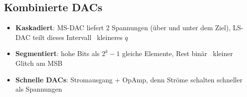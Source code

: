 \vspace{3pt}
\noindent\resizebox{\columnwidth}{!}{}


\subsection{Kombinierte DACs}

\begin{itemize}[nosep,leftmargin=*]
	\item \textbf{Kaskadiert}: MS-DAC liefert 2 Spannungen (über und unter dem Ziel), LS-DAC teilt dieses Intervall \textrightarrow\ kleineres $q$
	\item \textbf{Segmentiert}: hohe Bits als $2^k-1$ gleiche Elemente, Rest binär \textrightarrow\ kleiner Glitch am MSB
	\item \textbf{Schnelle DACs}: Stromausgang + OpAmp, denn Ströme schalten schneller als Spannungen
\end{itemize}
